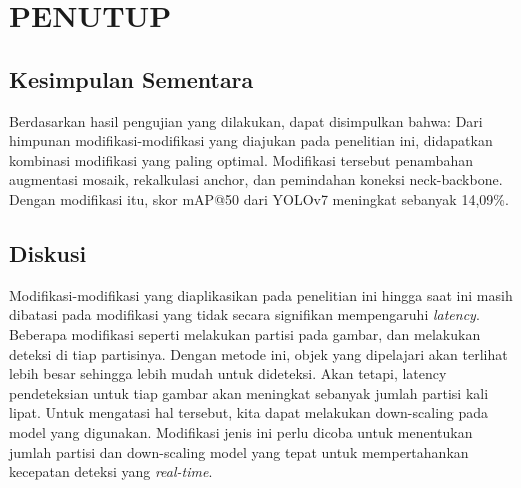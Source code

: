 \chapter{PENUTUP}


\section{Kesimpulan Sementara}
\label{section:kesimpulan}

Berdasarkan hasil pengujian yang dilakukan, dapat disimpulkan bahwa:
Dari himpunan modifikasi-modifikasi yang diajukan pada penelitian ini,
didapatkan kombinasi modifikasi yang paling optimal.
Modifikasi tersebut penambahan augmentasi mosaik, rekalkulasi anchor, dan pemindahan koneksi neck-backbone.
Dengan modifikasi itu, skor mAP@50 dari YOLOv7 meningkat sebanyak 14,09\%.

\section{Diskusi}
Modifikasi-modifikasi yang diaplikasikan pada penelitian ini hingga saat ini
masih dibatasi pada modifikasi yang tidak secara signifikan mempengaruhi \emph{latency}.
Beberapa modifikasi seperti melakukan partisi pada gambar, dan melakukan deteksi di
tiap partisinya. Dengan metode ini, objek yang dipelajari akan terlihat lebih besar
sehingga lebih mudah untuk dideteksi. Akan tetapi, latency pendeteksian untuk tiap gambar
akan meningkat sebanyak jumlah partisi kali lipat. Untuk mengatasi hal tersebut,
kita dapat melakukan down-scaling pada model yang digunakan. Modifikasi jenis ini
perlu dicoba untuk menentukan jumlah partisi dan down-scaling model yang tepat
untuk mempertahankan kecepatan deteksi yang \emph{real-time}.



